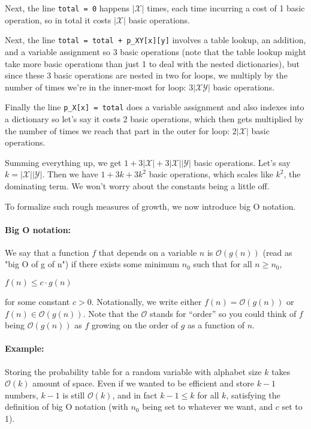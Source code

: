 \documentclass[6008notes.tex]{subfiles}
\begin{document}
Next, the line \lstinline{total = 0} happens $|\mathcal{X}|$ times, each time incurring a cost of 1 basic operation, so in total it costs $|\mathcal{X}|$ basic operations.

Next, the line \lstinline{total = total + p_XY[x][y]} involves a table lookup, an addition, and a variable assignment so 3 basic operations (note that the table lookup might take more basic operations than just 1 to deal with the nested dictionaries), but since these 3 basic operations are nested in two for loops, we multiply by the number of times we're in the inner-most for loop: $3|\mathcal{X}\mathcal{Y}|$ basic operations.

Finally the line \lstinline{p_X[x] = total} does a variable assignment and also indexes into a dictionary so let's say it costs 2 basic operations, which then gets multiplied by the number of times we reach that part in the outer for loop: $2|\mathcal{X}|$ basic operations.

Summing everything up, we get $1 + 3|\mathcal{X}|+3|\mathcal{X}||\mathcal{Y}|$ basic operations. Let's say $k=|\mathcal{X}||\mathcal{Y}|$. Then we have $1+3k+3k^2$ basic operations, which scales like $k^2$, the dominating term. We won't worry about the constants being a little off.

To formalize such rough measures of growth, we now introduce big O notation.

\paragraph{Big O notation:} We say that a function $f$ that depends on a variable $n$ is $\mathcal{O}(g(n))$ (read as "big O of g of n") if there exists some minimum $n_0$ such that for all $n \ge n_0$,

{\centering$f(n) \le c \cdot g(n)$ \par}

for some constant $c>0$. Notationally, we write either $f(n) = \mathcal{O}(g(n))$ or $f(n) \in \mathcal{O}(g(n))$. Note that the $\mathcal{O}$ stands for ``order'' so you could think of $f$ being $\mathcal{O}(g(n))$ as $f$ growing on the order of $g$ as a function of $n$.

\paragraph{Example:} Storing the probability table for a random variable with alphabet size $k$ takes $\mathcal{O}(k)$ amount of space. Even if we wanted to be efficient and store $k-1$ numbers, $k-1$ is still $\mathcal{O}(k)$, and in fact $k-1 \le k$ for all $k$, satisfying the definition of big O notation (with $n_0$ being set to whatever we want, and $c$ set to 1).
\end{document}
